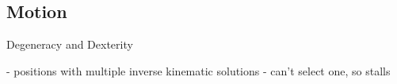 \subsection{Motion}

Degeneracy and Dexterity

 - positions with multiple inverse kinematic solutions - can't select one, so stalls
 
 
 
 
 
% 
